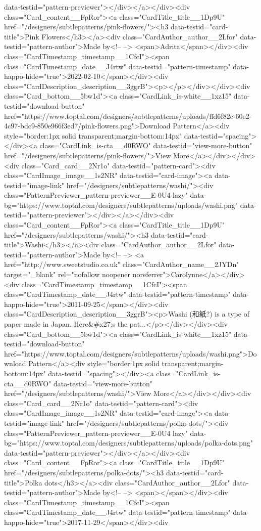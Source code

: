 data-testid="pattern-previewer"></div></a></div><div class="Card_content__FpRor"><a class="CardTitle_title__1Dp9U" href="/designers/subtlepatterns/pink-flowers/"><h3 data-testid="card-title">Pink Flowers</h3></a><div class="CardAuthor_author__2Lfor" data-testid="pattern-author">Made by<!-- --> <span>Adrita</span></div><div class="CardTimestamp_timestamp__1CfcI"><span class="CardTimestamp_date__J4rtw" data-testid="pattern-timestamp" data-happo-hide="true">2022-02-10</span></div><div class="CardDescription_description__3ggrB"><p></p></div></div><div class="Card_bottom__5bw1d"><a class="CardLink_is-white__1xz15" data-testid="download-button" href="https://www.toptal.com/designers/subtlepatterns/uploads/ffd6f82c-60e2-4c97-bdc9-850e966f3ed7/pink-flowers.png">Download Pattern</a><div style="border:1px solid transparent;margin-bottom:14px" data-testid="spacing"></div><a class="CardLink_is-cta__d0RWO" data-testid="view-more-button" href="/designers/subtlepatterns/pink-flowers/">View More</a></div></div><div class="Card_card__2Nr1o" data-testid="pattern-card"><div class="CardImage_image__1s2NR" data-testid="card-image"><a data-testid="image-link" href="/designers/subtlepatterns/washi/"><div class="PatternPreviewer_pattern-previewer__E-0U4 lazy" data-bg="https://www.toptal.com/designers/subtlepatterns/uploads/washi.png" data-testid="pattern-previewer"></div></a></div><div class="Card_content__FpRor"><a class="CardTitle_title__1Dp9U" href="/designers/subtlepatterns/washi/"><h3 data-testid="card-title">Washi</h3></a><div class="CardAuthor_author__2Lfor" data-testid="pattern-author">Made by<!-- --> <a href="http://www.sweetstudio.co.uk" class="CardAuthor_name__2JYDn" target="_blank" rel="nofollow noopener noreferrer">Carolynne</a></div><div class="CardTimestamp_timestamp__1CfcI"><span class="CardTimestamp_date__J4rtw" data-testid="pattern-timestamp" data-happo-hide="true">2011-09-25</span></div><div class="CardDescription_description__3ggrB"><p>Washi (和紙?) is a type of paper made in Japan. Here&#x27;s the pat...</p></div></div><div class="Card_bottom__5bw1d"><a class="CardLink_is-white__1xz15" data-testid="download-button" href="https://www.toptal.com/designers/subtlepatterns/uploads/washi.png">Download Pattern</a><div style="border:1px solid transparent;margin-bottom:14px" data-testid="spacing"></div><a class="CardLink_is-cta__d0RWO" data-testid="view-more-button" href="/designers/subtlepatterns/washi/">View More</a></div></div><div class="Card_card__2Nr1o" data-testid="pattern-card"><div class="CardImage_image__1s2NR" data-testid="card-image"><a data-testid="image-link" href="/designers/subtlepatterns/polka-dots/"><div class="PatternPreviewer_pattern-previewer__E-0U4 lazy" data-bg="https://www.toptal.com/designers/subtlepatterns/uploads/polka-dots.png" data-testid="pattern-previewer"></div></a></div><div class="Card_content__FpRor"><a class="CardTitle_title__1Dp9U" href="/designers/subtlepatterns/polka-dots/"><h3 data-testid="card-title">Polka dots</h3></a><div class="CardAuthor_author__2Lfor" data-testid="pattern-author">Made by<!-- --> <span></span></div><div class="CardTimestamp_timestamp__1CfcI"><span class="CardTimestamp_date__J4rtw" data-testid="pattern-timestamp" data-happo-hide="true">2017-11-29</span></div><div 